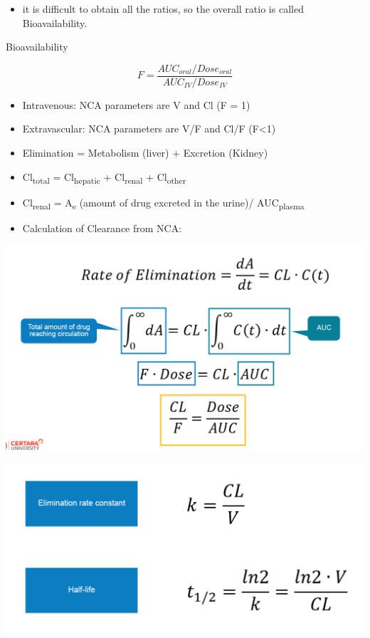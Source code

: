 \documentclass[
  letterpaper,
  DIV=11,
  numbers=noendperiod]{scrreprt}
\providecommand{\tightlist}{%
  \setlength{\itemsep}{0pt}\setlength{\parskip}{0pt}}\usepackage{longtable,booktabs,array}
\begin{document}
\begin{itemize}
\tightlist
\item
  it is difficult to obtain all the ratios, so the overall ratio is
  called Bioavailability.
\end{itemize}

Bioavailability

\[
F = \frac{AUC_{oral}/Dose_{oral}}{AUC_{IV}/Dose_{IV}}
\]

\begin{itemize}
\item
  Intravenous: NCA parameters are V and Cl (F = 1)
\item
  Extravascular: NCA parameters are V/F and Cl/F (F\textless1)
\item
  Elimination = Metabolism (liver) + Excretion (Kidney)
\item
  Cl\textsubscript{total} = Cl\textsubscript{hepatic} +
  Cl\textsubscript{renal} + Cl\textsubscript{other}
\item
  Cl\textsubscript{renal} = A\textsubscript{e} (amount of drug excreted
  in the urine)/ AUC\textsubscript{plasma}
\item
  Calculation of Clearance from NCA:
\end{itemize}

\includegraphics{./images/image-281401148.png}

\includegraphics{./images/image-2093126627.png}
\end{document}
